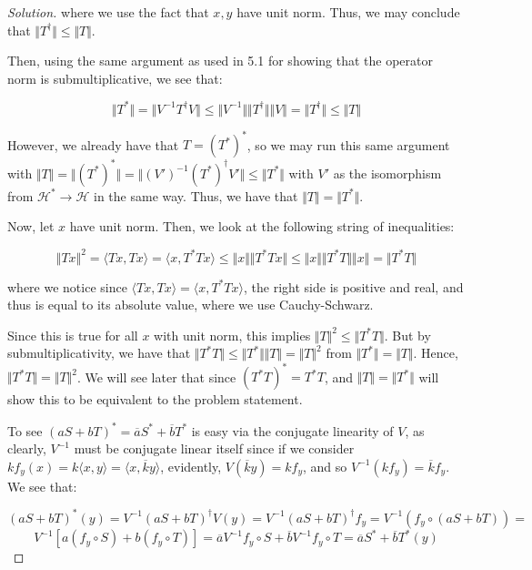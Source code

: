 \documentclass[10pt]{article}
\begin{document}
\begin{proof}[Solution]
where we use the fact that $x, y$ have unit norm. Thus, we may conclude that $\Vert T^\dag \Vert \leq \Vert T \Vert$.

Then, using the same argument as used in 5.1 for showing that the operator norm is submultiplicative, we see that:

$$ \Vert T^* \Vert = \Vert V^{-1} T^\dag V \Vert \leq \Vert V^{-1} \Vert \Vert T^\dag \Vert \Vert V \Vert = \Vert T^\dag \Vert \leq \Vert T \Vert $$

However, we already have that $T =  (T^*)^*$, so we may run this same argument with $\Vert T \Vert = \Vert (T^*)^* \Vert = \Vert (V')^{-1} (T^*)^\dag V' \Vert \leq \Vert T^* \Vert$ with $V'$ as the isomorphism from $\mathcal{H}^* \to \mathcal{H}$ in the same way. Thus, we have that $\Vert T \Vert = \Vert T^* \Vert$.

Now, let $x$ have unit norm. Then, we look at the following string of inequalities:

$$ \Vert Tx \Vert^2 = \langle Tx , Tx \rangle = \langle x , T^* Tx \rangle \leq \Vert x \Vert \Vert T^*T x \Vert \leq \Vert x \Vert \Vert T^* T \Vert \Vert x \Vert = \Vert T^* T \Vert$$

where we notice since $ \langle Tx , Tx \rangle = \langle x , T^* Tx \rangle$, the right side is positive and real, and thus is equal to its absolute value, where we use Cauchy-Schwarz.

Since this is true for all $x$ with unit norm, this implies $\Vert T \Vert^2 \leq \Vert T^* T \Vert$. But by submultiplicativity, we have that $\Vert T^* T \Vert \leq \Vert T^* \Vert \Vert T \Vert = \Vert T \Vert^2$ from $\Vert T^* \Vert = \Vert T \Vert$. Hence, $\Vert T^* T \Vert = \Vert T \Vert^2$. We will see later that since $(T^* T)^* = T^* T$, and $\Vert T \Vert = \Vert T^* \Vert$ will show this to be equivalent to the problem statement.

To see $( aS + bT)^* = \overline{a}S^* + \overline{b}T^*$ is easy via the conjugate linearity of $V$, as clearly, $V^{-1}$ must be conjugate linear itself since if we consider $kf_y(x) = k\langle x,y \rangle = \langle x, \overline{k} y \rangle$, evidently, $V(\overline{k}y) = k f_y$, and so $V^{-1}(kf_y) = \overline{k}f_y$. We see that:

$$ (aS + bT)^*(y) = V^{-1}(aS + bT)^\dag V(y) = V^{-1}(aS + bT)^\dag f_y = V^{-1} (f_y \circ (aS + bT)) = $$
$$V^{-1} [a (f_y \circ S) + b (f_y \circ T)] = \overline{a} V^{-1} f_y \circ S + \overline{b}V^{-1} f_y \circ T = \overline{a} S^* + \overline{b} T^*(y)$$


\end{proof}
\end{document}
